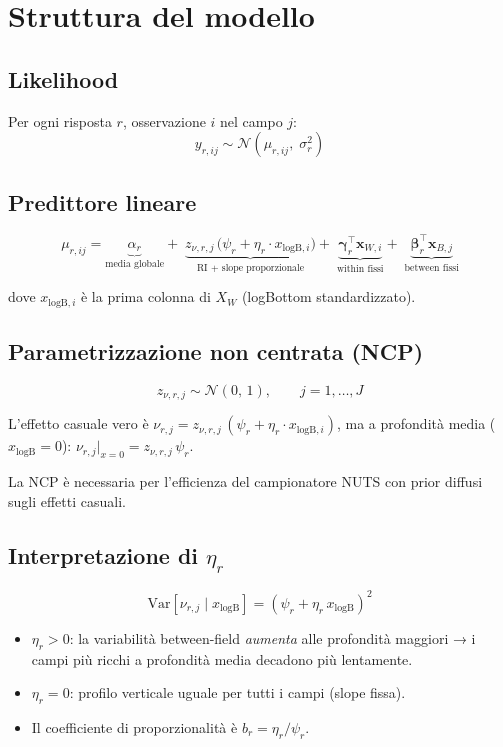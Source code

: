 \documentclass[11pt, a4paper]{article}
\newcommand{\N}{\mathcal{N}}
\newcommand{\Var}{\mathrm{Var}}
\renewcommand{\vec}[1]{\bm{#1}}
\begin{document}
\section{Struttura del modello}

\subsection{Likelihood}

Per ogni risposta $r$, osservazione $i$ nel campo $j$:
\[
  y_{r,ij} \sim \N\!\left(\mu_{r,ij},\; \sigma_r^2\right)
\]

\subsection{Predittore lineare}

\[
  \boxed{
  \mu_{r,ij} =
    \underbrace{\alpha_r}_{\text{media globale}}
    +\;
    \underbrace{z_{\nu,r,j}\,\bigl(\psi_r + \eta_r \cdot x_{\text{logB},i}\bigr)}_{\text{RI + slope proporzionale}}
    +\;
    \underbrace{\vec{\gamma}_r^\top \vec{x}_{W,i}}_{\text{within fissi}}
    +\;
    \underbrace{\vec{\beta}_r^\top \vec{x}_{B,j}}_{\text{between fissi}}
  }
\]

dove $x_{\text{logB},i}$ è la prima colonna di $X_W$ (logBottom standardizzato).

\subsection{Parametrizzazione non centrata (NCP)}

\[
  z_{\nu,r,j} \sim \N(0,\,1), \qquad j = 1,\ldots,J
\]

L'effetto casuale vero è $\nu_{r,j} = z_{\nu,r,j}\,(\psi_r + \eta_r \cdot x_{\text{logB},i})$,
ma a profondità media ($x_{\text{logB}} = 0$):
$\nu_{r,j}\big|_{x=0} = z_{\nu,r,j}\,\psi_r$.

La NCP è necessaria per l'efficienza del campionatore NUTS con prior diffusi
sugli effetti casuali.

\subsection{Interpretazione di $\eta_r$}

\[
  \Var[\nu_{r,j} \mid x_{\text{logB}}]
  = \left(\psi_r + \eta_r \, x_{\text{logB}}\right)^2
\]

\begin{itemize}
  \item $\eta_r > 0$: la variabilità between-field \emph{aumenta} alle profondità
        maggiori → i campi più ricchi a profondità media decadono più lentamente.
  \item $\eta_r = 0$: profilo verticale uguale per tutti i campi (slope fissa).
  \item Il coefficiente di proporzionalità è $b_r = \eta_r / \psi_r$.
\end{itemize}
\end{document}
